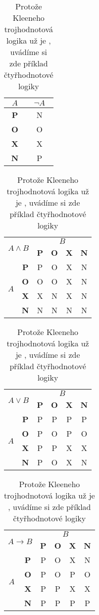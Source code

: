 \documentclass[hidelinks, 11pt, a4paper]{article}
\begin{document}
\begin{table}[h]
    \centering
    \begin{tabular}{|c|c|} \hline
        $A$ & $\neg A$ \\ \hline
        \textbf{P} & N \\ \hline
        \textbf{O} & O \\ \hline
        \textbf{X} & X \\ \hline
        \textbf{N} & P \\ \hline
    \end{tabular}
    \begin{tabular}{|c|c|c|c|c|c|}\hline
        \multicolumn{2}{|c|}{\multirow{2}{*}{$A \land B$}}&\multicolumn{4}{c|}{$B$} \\ \cline{3-6}
        \multicolumn{2}{|c|}{}&\textbf{P} & \textbf{O} & \textbf{X} & \textbf{N} \\ \hline
        \multirow{4}{*}{$A$} & \textbf{P} & P & O & X & N \\ \cline{2-6}
        &\textbf{O} & O & O & X & N \\ \cline{2-6}
        &\textbf{X} & X & N & X & N \\ \cline{2-6}
        &\textbf{N} & N & N & N & N \\ \hline
    \end{tabular}
    \begin{tabular}{|c|c|c|c|c|c|}\hline
        \multicolumn{2}{|c|}{\multirow{2}{*}{$A \lor B$}}&\multicolumn{4}{c|}{$B$} \\ \cline{3-6}
        \multicolumn{2}{|c|}{}&\textbf{P} & \textbf{O} & \textbf{X} & \textbf{N} \\ \hline
        \multirow{4}{*}{$A$} & \textbf{P} & P & P & P & P \\ \cline{2-6}
        &\textbf{O} & P & O & P & O \\ \cline{2-6}
        &\textbf{X} & P & P & X & X \\ \cline{2-6}
        &\textbf{N} & P & O & X & N \\ \hline
    \end{tabular}
    \begin{tabular}{|c|c|c|c|c|c|}\hline
        \multicolumn{2}{|c|}{\multirow{2}{*}{$A \to B$}}&\multicolumn{4}{c|}{$B$} \\ \cline{3-6}
        \multicolumn{2}{|c|}{}&\textbf{P} & \textbf{O} & \textbf{X} & \textbf{N} \\ \hline
        \multirow{4}{*}{$A$} & \textbf{P} & P & O & X & N \\ \cline{2-6}
        &\textbf{O} & P & O & P & O \\ \cline{2-6}
        &\textbf{X} & P & P & X & X \\ \cline{2-6}
        &\textbf{N} & P & P & P & P \\ \hline
    \end{tabular}
    \caption{Protože Kleeneho trojhodnotová logika už je , uvádíme si zde příklad čtyřhodnotové logiky} 
    \label{tab:tabulka2}
\end{table}
\bigskip
\pagebreak
\end{document}
